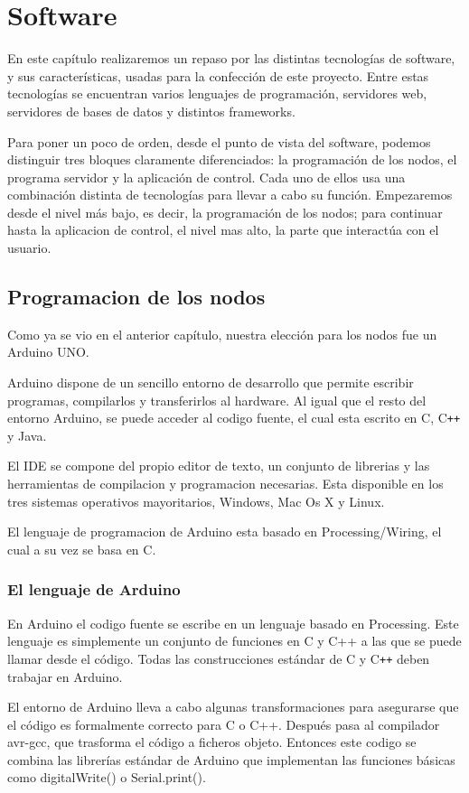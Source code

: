 \chapter{Software}
En este capítulo realizaremos un repaso por las distintas tecnologías de software, y sus características, usadas para la confección de este proyecto. Entre estas tecnologías  se encuentran  varios lenguajes de programación, servidores web, servidores de bases de datos y distintos frameworks.


Para poner un poco de orden, desde el punto de vista del software, podemos distinguir tres bloques claramente diferenciados: la programación de los nodos, el programa servidor y la aplicación de control. Cada uno de ellos usa una combinación distinta de tecnologías para llevar a cabo su función.  Empezaremos desde el nivel más bajo, es decir, la programación de los nodos; para continuar hasta la aplicacion de control, el nivel mas alto, la parte que interactúa con el usuario.
 
\section{Programacion de los nodos}
Como ya se vio en el anterior capítulo, nuestra elección para los nodos fue un Arduino UNO. 

Arduino dispone de un sencillo entorno de desarrollo que permite escribir programas, compilarlos y transferirlos al hardware. Al igual que el resto del entorno  Arduino, se  puede acceder al codigo fuente, el cual esta escrito en C, C{}\verb!++! y Java.

El IDE se compone del propio editor de texto, un conjunto de librerias y las herramientas de compilacion y programacion necesarias. Esta disponible en los tres sistemas operativos mayoritarios, Windows, Mac Os X y Linux.

El lenguaje de programacion de Arduino esta basado en Processing/Wiring, el cual a su vez se basa en C.

\subsection{El lenguaje de Arduino}
En Arduino  el codigo fuente se escribe en un lenguaje basado en Processing. Este lenguaje es simplemente un conjunto de funciones en C y C++ a las que se puede llamar desde el código.  Todas las construcciones estándar de C y C{}\verb!++! deben trabajar en Arduino.

El entorno de Arduino lleva a cabo algunas transformaciones para asegurarse que el código es formalmente correcto para C o C++. Después pasa al compilador avr-gcc, que trasforma el código a ficheros objeto. Entonces este codigo se combina  las librerías estándar de Arduino que implementan las funciones básicas como digitalWrite() o Serial.print().


